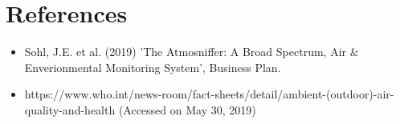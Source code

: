 \chapter{References} %

\begin{itemize}
	\item Sohl, J.E. et al. (2019) 'The Atmosniffer: A Broad Spectrum, Air $\&$ Enverionmental Monitoring System', Business Plan.
	\item https://www.who.int/news-room/fact-sheets/detail/ambient-(outdoor)-air-quality-and-health (Accessed on May 30, 2019) 
\end{itemize}